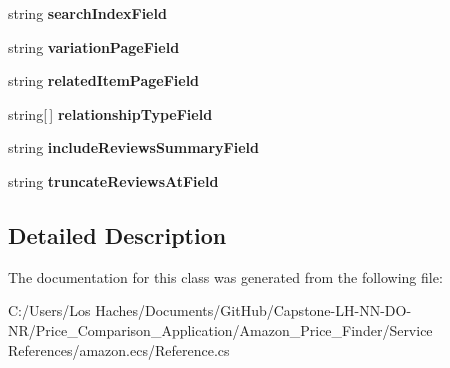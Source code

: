 \begin{DoxyCompactItemize}
\item 
\hypertarget{class_price___comparison_1_1amazon_1_1ecs_1_1_item_lookup_request_ad72a46ff3bf950cfd04f7019ae6907e8}{string {\bfseries search\-Index\-Field}}\label{class_price___comparison_1_1amazon_1_1ecs_1_1_item_lookup_request_ad72a46ff3bf950cfd04f7019ae6907e8}

\item 
\hypertarget{class_price___comparison_1_1amazon_1_1ecs_1_1_item_lookup_request_a43fd1fc6dba0b9957f1a0b8624ef17a9}{string {\bfseries variation\-Page\-Field}}\label{class_price___comparison_1_1amazon_1_1ecs_1_1_item_lookup_request_a43fd1fc6dba0b9957f1a0b8624ef17a9}

\item 
\hypertarget{class_price___comparison_1_1amazon_1_1ecs_1_1_item_lookup_request_a530e4adc982d9dd469f45ac54e508927}{string {\bfseries related\-Item\-Page\-Field}}\label{class_price___comparison_1_1amazon_1_1ecs_1_1_item_lookup_request_a530e4adc982d9dd469f45ac54e508927}

\item 
\hypertarget{class_price___comparison_1_1amazon_1_1ecs_1_1_item_lookup_request_a6ca5db2586012fa4803ec4afc6d3ec14}{string\mbox{[}$\,$\mbox{]} {\bfseries relationship\-Type\-Field}}\label{class_price___comparison_1_1amazon_1_1ecs_1_1_item_lookup_request_a6ca5db2586012fa4803ec4afc6d3ec14}

\item 
\hypertarget{class_price___comparison_1_1amazon_1_1ecs_1_1_item_lookup_request_a98d37619c2f8dd072b4d3ffa175e8fdf}{string {\bfseries include\-Reviews\-Summary\-Field}}\label{class_price___comparison_1_1amazon_1_1ecs_1_1_item_lookup_request_a98d37619c2f8dd072b4d3ffa175e8fdf}

\item 
\hypertarget{class_price___comparison_1_1amazon_1_1ecs_1_1_item_lookup_request_a72b3255d8c7caae38eedad8ee6869d99}{string {\bfseries truncate\-Reviews\-At\-Field}}\label{class_price___comparison_1_1amazon_1_1ecs_1_1_item_lookup_request_a72b3255d8c7caae38eedad8ee6869d99}

\end{DoxyCompactItemize}


\subsection{Detailed Description}


The documentation for this class was generated from the following file\-:\begin{DoxyCompactItemize}
\item 
C\-:/\-Users/\-Los Haches/\-Documents/\-Git\-Hub/\-Capstone-\/\-L\-H-\/\-N\-N-\/\-D\-O-\/\-N\-R/\-Price\-\_\-\-Comparison\-\_\-\-Application/\-Amazon\-\_\-\-Price\-\_\-\-Finder/\-Service References/amazon.\-ecs/Reference.\-cs\end{DoxyCompactItemize}
